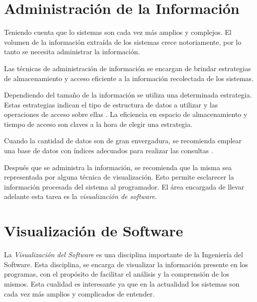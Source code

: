 \documentclass[a4paper,12pt]{report}
\begin{document}


\section{Administración de la Información}

Teniendo cuenta que lo sistemas son cada vez más amplios y complejos. El volumen de la información extraída de los sistemas crece notoriamente, por lo tanto se necesita administrar la información.

Las técnicas de administración de información se encargan de brindar estrategias de almacenamiento y acceso eficiente a la información recolectada de los sistemas. 

Dependiendo del tamaño de la información se utiliza una determinada estrategia. Estas estrategias indican el tipo de estructura de datos a utilizar y las operaciones de acceso sobre ellas \cite{AAJU83,TSTA80}. La eficiencia en espacio de almacenamiento y tiempo de acceso son claves a la hora de elegir una estrategia.

Cuando la cantidad de datos son de gran envergadura, se recomienda emplear una base de datos con índices adecuados para realizar las consultas \cite{ERNS99}.

Después que se administra la información, se recomienda  que la misma sea representada por alguna técnica de visualización. Esto permite esclarecer la información procesada del sistema al programador. El área encargada de llevar adelante esta tarea es la \textit{visualización de software}.


\section{Visualización de Software}

La \textit{Visualización del Software} es una disciplina importante de la Ingeniería del Software. Esta disciplina, se encarga de visualizar la información presente en los programas, con el propósito de facilitar el análisis y la comprensión de los mismos. Esta cualidad es interesante ya que en la actualidad los sistemas son cada vez más amplios y complicados de entender.
\end{document}
